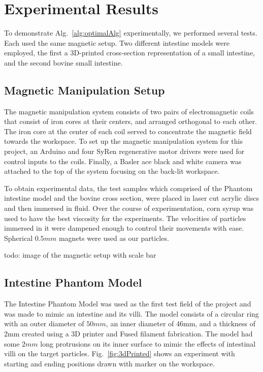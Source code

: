
\section{Experimental Results}\label{sec:expResults}

To demonstrate Alg.~\ref{alg:optimalAlg} experimentally, we performed several tests.
Each used the same magnetic setup.
 Two different intestine models were employed, the first a 3D-printed cross-section representation of a small intestine, and the second bovine small intestine.
 
 \subsection{Magnetic Manipulation Setup}
 
 The magnetic manipulation system consists of two pairs of electromagnetic coils that consist of iron cores at their centers, and arranged orthogonal to each other. The iron core at the center of each coil served to concentrate the magnetic field towards the workspace. To set up the magnetic manipulation system for this project, an Arduino and four SyRen regenerative motor drivers were used for control inputs to the coils. Finally, a Basler ace black and white camera was attached to the top of the system focusing on the back-lit workspace. 
 
To obtain experimental data, the test samples which comprised of the Phantom intestine model and the bovine cross section, were placed in laser cut acrylic discs and then immersed in fluid. Over the course of experimentation, corn syrup was used to have the best viscosity for the experiments. The velocities of particles immersed in it were dampened enough to control their movements with ease. Spherical $0.5 mm$ magnets were used as our particles.
 

todo: image of the magnetic setup with scale bar


\subsection{Intestine Phantom Model}

The Intestine Phantom Model was used as the first test field of the project and was made to mimic an intestine and its villi. The model consists of a circular ring with an outer diameter of $50 mm$, an inner diameter of 46mm, and a thickness of 2mm created using a 3D printer and Fused filament fabrication. The model had some $2 mm$ long protrusions on its inner surface to mimic the effects of intestinal villi on the target particles. Fig.~\ref{fig:3dPrinted} shows an experiment with starting and ending positions drawn with marker on the workspace. 

